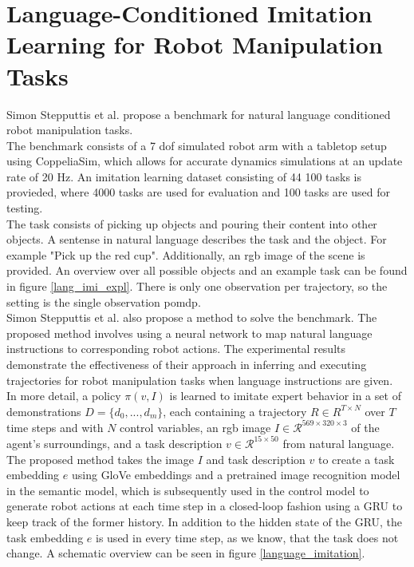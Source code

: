 \chapter{Language-Conditioned Imitation Learning for Robot Manipulation Tasks}
\label{LCILRM}
Simon Stepputtis et al. \cite{stepputtis2020languageconditioned} propose a benchmark for natural language conditioned robot manipulation tasks. \\
The benchmark consists of a 7 dof simulated robot arm with a 
tabletop setup using CoppeliaSim, which allows for accurate dynamics simulations at an update rate of 20 Hz. 
An imitation learning dataset consisting of 44 100 tasks is provieded, where 4000 tasks are used for 
evaluation and 100 tasks are used for testing.\\

The task consists of picking up objects and pouring their content into other objects. A sentense in natural language describes the task and the object. 
For example "Pick up the red cup". Additionally, an rgb image of the scene is provided. An overview over 
all possible objects and an example task can be found in figure \ref{lang_imi_expl}. 
There is only one observation per trajectory, so the setting is the single observation \ac{pomdp}.  \\


Simon Stepputtis et al. \cite{stepputtis2020languageconditioned} also propose a method to solve the benchmark. 
The proposed method involves using a neural network to map natural language instructions to 
corresponding robot actions. The experimental results demonstrate the effectiveness of their approach in inferring and executing trajectories for robot manipulation 
tasks when language instructions are given. \\

In more detail, a policy $\pi(v,I)$ is learned to imitate expert behavior in a set of demonstrations $D = \{d_0,...,d_m\}$, each containing a trajectory 
$R \in R^{T \times N}$ over $T$ time steps and with $N$ control variables, an rgb image $I \in \mathcal{R}^{569 \times 320 \times 3}$ of the agent's surroundings, 
and a task description $v \in \mathcal{R}^{15 \times 50}$ from natural language. The proposed method takes the image $I$ and task description $v$ 
to create a task embedding $e$ using GloVe embeddings and a pretrained image recognition model in the semantic model, 
which is subsequently used in the control model to generate robot actions at each time step in a closed-loop 
fashion using a GRU to keep track of the former history. In addition to the hidden state of the GRU, 
the task embedding $e$ is used in every time step, as we know, that the task does not change. A schematic overview can be seen in figure \ref{language_imitation}. \\

